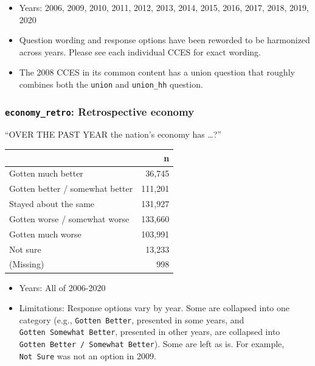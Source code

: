 \documentclass[10pt,article,oneside]{memoir}
\theoremstyle{definition}
\begin{document}
\begin{itemize}
\tightlist
\item
  Years: 2006, 2009, 2010, 2011, 2012, 2013, 2014, 2015, 2016, 2017,
  2018, 2019, 2020
\item
  Question wording and response options have been reworded to be
  harmonized across years. Please see each individual CCES for exact
  wording.
\item
  The 2008 CCES in its common content has a union question that roughly
  combines both the \texttt{union} and \texttt{union\_hh} question.
\end{itemize}

\hypertarget{economy_retro-retrospective-economy}{%
\subsubsection{\texorpdfstring{\texttt{economy\_retro}: Retrospective
economy}{economy\_retro: Retrospective economy}}\label{economy_retro-retrospective-economy}}

``OVER THE PAST YEAR the nation's economy has \ldots?''

\begin{table}[H]
\centering
\begin{tabular}{lr}
\toprule
 & n\\
\midrule
Gotten much better & 36,745\\
Gotten better / somewhat better & 111,201\\
Stayed about the same & 131,927\\
Gotten worse / somewhat worse & 133,660\\
Gotten much worse & 103,991\\
Not sure & 13,233\\
(Missing) & 998\\
\bottomrule
\end{tabular}
\end{table}

\begin{itemize}
\tightlist
\item
  Years: All of 2006-2020
\item
  Limitations: Response options vary by year. Some are collapsed into
  one category (e.g., \texttt{Gotten\ Better}, presented in some years,
  and \texttt{Gotten\ Somewhat\ Better}, presented in other years, are
  collapsed into \texttt{Gotten\ Better\ /\ Somewhat\ Better}). Some are
  left as is. For example, \texttt{Not\ Sure} was not an option in 2009.
\end{itemize}
\end{document}
